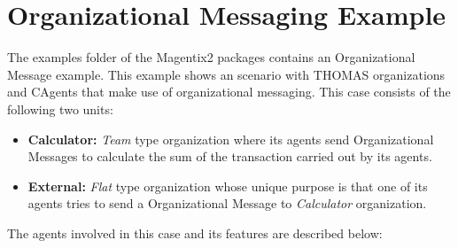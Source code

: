 \section{Organizational Messaging Example}

The examples folder of the Magentix2 packages contains an Organizational Message example. This example
shows an scenario with THOMAS organizations and CAgents that make use of organizational messaging. This
case consists of the following two units:

\begin{itemize}
\item \textbf{Calculator:} \textit{Team} type organization where its agents send Organizational Messages to
  calculate the sum of the transaction carried out by its agents.
\item \textbf{External:} \textit{Flat} type organization whose unique purpose is that one of its agents
  tries to send a Organizational Message to \textit{Calculator} organization.
\end{itemize}

The agents involved in this case and its features are described below:

